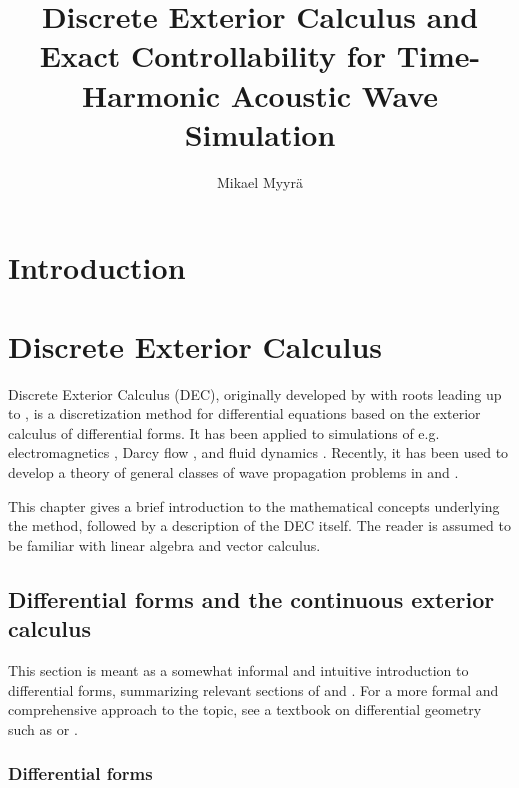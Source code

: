 \documentclass[utf8,english]{gradu3}
\title{Discrete Exterior Calculus and Exact Controllability for Time-Harmonic Acoustic Wave Simulation}
\author{Mikael Myyrä}
\begin{document}
\maketitle

\hfuzz=1.5pt
\mainmatter
\hfuzz=0pt


\chapter{Introduction}




\chapter{Discrete Exterior Calculus}

Discrete Exterior Calculus (DEC),
originally developed by \textcite{desbrun_discrete_2005}
with roots leading up to \textcite{yee_numerical_1966},
is a discretization method for differential equations
based on the exterior calculus of differential forms.
It has been applied to simulations of e.g. electromagnetics
\parencite{rabina_efficient_2015, monkola_discrete_2022},
Darcy flow \parencite{hirani_numerical_2015},
and fluid dynamics \parencite{nitschke_discrete_2017}.
Recently, it has been used to develop a theory 
of general classes of wave propagation problems
in \parencite{rabina_generalized_2018} and \parencite{rossi_systematisation_2021}.

This chapter gives a brief introduction to the mathematical concepts
underlying the method, followed by a description of the DEC itself.
The reader is assumed to be familiar with linear algebra and vector calculus.


\section{Differential forms and the continuous exterior calculus}

This section is meant as a somewhat informal and intuitive introduction
to differential forms, summarizing relevant sections of
\parencite{blair_perot_differential_2014} and \parencite{crane_digital_2013}.
For a more formal and comprehensive approach to the topic,
see a textbook on differential geometry such as \parencite{lee_introduction_2012}
or \parencite{abraham_manifolds_2012}.


\subsection{Differential forms}
\end{document}
